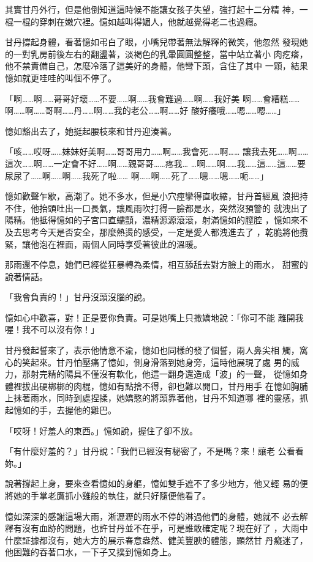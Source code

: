 其實甘丹外行，但是他倒知道這時候不能讓女孩子失望，強打起十二分精
神，一棍一棍的穿刺在嫩穴裡。憶如越叫得媚人，他就越覺得老二也過癮。

甘丹撐起身體，看著憶如弔白了眼，小嘴兒帶著無法解釋的微笑，他忽然
發現她的一對乳房前後左右的翻盪著，淡褐色的乳暈圓圓整整，當中站立著小
肉疙瘩，他不禁責備自己，怎麼冷落了這美好的身體，他彎下頭，含住了其中
一顆，結果憶如就更哇哇的叫個不停了。

「啊……啊……哥哥好壞……不要……啊……我會難過……啊……我好美
啊……會糟糕……啊……啊……哥啊……丹……啊……我的老公……啊……好
酸好癢哦……嗯……嗯……」

憶如豁出去了，她挺起腰枝來和甘丹迎湊著。

「咳……哎呀……妹妹好美啊……哥哥用力……啊……我會死……啊……
讓我去死……啊……這次……啊……一定會不好……啊……親哥哥……疼我…
…啊……啊……我……這……這……要尿尿了……啊……啊……我死了啦……
啊……啊……死了……嗯……嗯……呃……」

憶如歡聲乍歇，高潮了。她不多水，但是小穴痙攣得直收縮，甘丹首經風
浪把持不住，他抬頭吐出一口長氣，讓風雨吹打得一臉都是水，突然沒預警的
就洩出了陽精。他抵得憶如的子宮口直蠕顫，濃精源源滾滾，射滿憶如的膣腔
，憶如來不及去思考今天是否安全，那麼熱燙的感受，一定是愛人都洩進去了
，乾脆將他攬緊，讓他泡在裡面，兩個人同時享受著彼此的溫暖。

那雨還不停息，她們已經從狂暴轉為柔情，相互舔舐去對方臉上的雨水，
甜蜜的說著情話。

「我會負責的！」甘丹沒頭沒腦的說。

憶如心中歡喜，對！正是要你負責。可是她嘴上只撒嬌地說：「你可不能
離開我喔！我不可以沒有你！」

甘丹發起誓來了，表示他情意不渝，憶如也同樣的發了個誓，兩人鼻尖相
觸，窩心的笑起來。甘丹怕壓痛了憶如，側身滑落到她身旁，這時他展現了處
男的威力，那射完精的陽具不僅沒有軟化，他這一翻身還造成「波」的一聲，
從憶如身體裡拔出硬梆梆的肉棍，憶如有點捨不得，卻也難以開口，甘丹用手
在憶如胸脯上抹著雨水，同時到處捏揉，她嬌憨的將頭靠著他，甘丹不知道哪
裡的靈感，抓起憶如的手，去握他的雞巴。

「哎呀！好羞人的東西。」憶如說，握住了卻不放。

「有什麼好羞的？」甘丹說：「我們已經沒有秘密了，不是嗎？來！讓老
公看看妳。」

說著撐起上身，要來查看憶如的身軀，憶如雙手遮不了多少地方，他又輕
易的便將她的手掌老鷹抓小雞般的執住，就只好隨便他看了。

憶如深深的感謝這場大雨，淅瀝瀝的雨水不停的淋過他們的身體，她就不
必去解釋有沒有血跡的問題，也許甘丹並不在乎，可是誰敢確定呢？現在好了
，大雨中什麼証據都沒有，她大方的展示春意盎然、健美豐腴的體態，顯然甘
丹癡迷了，他困難的吞著口水，一下子又撲到憶如身上。

